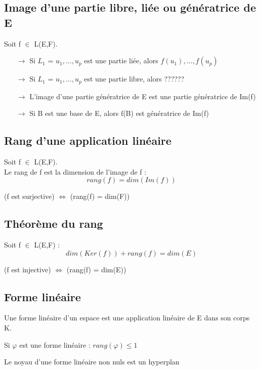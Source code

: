 \subsection{Image d'une partie libre, liée ou génératrice de E}
Soit f $\in$ L(E,F).\\
\begin{itemize}
 \item[$\rightarrow$]Si $L_1$ = {$u_1,...,u_p$} est une partie liée, alors {$f(u_1),...,f(u_p)$}\\
 \item[$\rightarrow$]Si $L_1$ = {$u_1,...,u_p$} est une partie libre, alors ??????\\
 \item[$\rightarrow$]L'image d'une partie génératrice de E est une partie génératrice de Im(f)
 \item[$\rightarrow$]Si B est une base de E, alors f(B) est génératrice de Im(f)
\end{itemize}
\subsection{Rang d'une application linéaire}
\begin{de}
Soit f $\in$ L(E,F).\\
Le rang de f est la dimension de l'image de f :
$$rang(f) = dim(Im(f))$$
\end{de}
\begin{prop}
(f est surjective) $\Leftrightarrow$ (rang(f) = dim(F))
\end{prop}
\subsection{Théorème du rang}
Soit f $\in$ L(E,F) :
$$dim(Ker(f)) + rang(f) = dim(E)$$
\begin{prop}
(f est injective) $\Leftrightarrow$ (rang(f) = dim(E))
\end{prop}
\subsection{Forme linéaire}
\begin{de}
Une forme linéaire d'un espace est une application linéaire de E dans son corps K.
\end{de}
\begin{prop}
Si $\varphi$ est une forme linéaire : $rang(\varphi) \leq 1$
\end{prop}

\begin{prop}
Le noyau d'une forme linéaire non nuls est un hyperplan
\end{prop}
